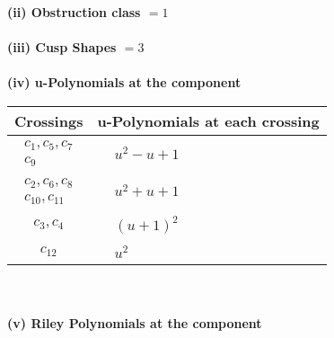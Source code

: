\documentclass[1p]{elsarticle_modified}
\theoremstyle{definition}
\begin{document}
\flushleft \textbf{(ii) Obstruction class $= 1$}\\~\\
\flushleft \textbf{(iii) Cusp Shapes $= 3$}\\~\\
\newpage\renewcommand{\arraystretch}{1}
\flushleft \textbf{(iv) u-Polynomials at the component}\newline \\
\begin{tabular}{m{50pt}|m{274pt}}
Crossings & \hspace{64pt}u-Polynomials at each crossing \\
\hline $$\begin{aligned}c_{1},c_{5},c_{7}\\c_{9}\end{aligned}$$&$\begin{aligned}
&u^2- u+1
\end{aligned}$\\
\hline $$\begin{aligned}c_{2},c_{6},c_{8}\\c_{10},c_{11}\end{aligned}$$&$\begin{aligned}
&u^2+u+1
\end{aligned}$\\
\hline $$\begin{aligned}c_{3},c_{4}\end{aligned}$$&$\begin{aligned}
&(u+1)^2
\end{aligned}$\\
\hline $$\begin{aligned}c_{12}\end{aligned}$$&$\begin{aligned}
&u^2
\end{aligned}$\\
\hline
\end{tabular}\\~\\
\newpage\renewcommand{\arraystretch}{1}
\flushleft \textbf{(v) Riley Polynomials at the component}\newline \\
\end{document}
